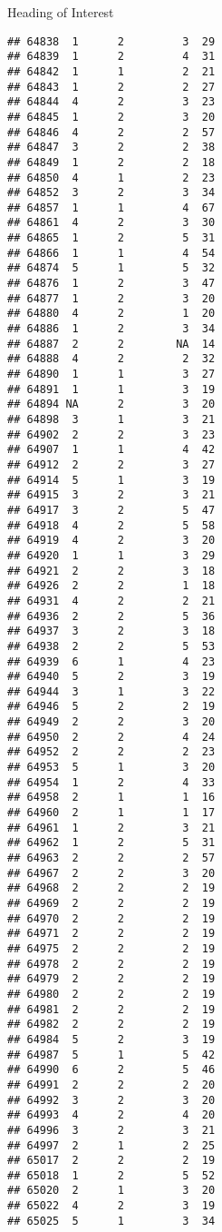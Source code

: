 \documentclass[
  ignorenonframetext,
]{beamer}
\begin{document}
\begin{frame}[fragile]{Heading of Interest}
\begin{verbatim}
## 64838  1      2         3  29
## 64839  1      2         4  31
## 64842  1      1         2  21
## 64843  1      2         2  27
## 64844  4      2         3  23
## 64845  1      2         3  20
## 64846  4      2         2  57
## 64847  3      2         2  38
## 64849  1      2         2  18
## 64850  4      1         2  23
## 64852  3      2         3  34
## 64857  1      1         4  67
## 64861  4      2         3  30
## 64865  1      2         5  31
## 64866  1      1         4  54
## 64874  5      1         5  32
## 64876  1      2         3  47
## 64877  1      2         3  20
## 64880  4      2         1  20
## 64886  1      2         3  34
## 64887  2      2        NA  14
## 64888  4      2         2  32
## 64890  1      1         3  27
## 64891  1      1         3  19
## 64894 NA      2         3  20
## 64898  3      1         3  21
## 64902  2      2         3  23
## 64907  1      1         4  42
## 64912  2      2         3  27
## 64914  5      1         3  19
## 64915  3      2         3  21
## 64917  3      2         5  47
## 64918  4      2         5  58
## 64919  4      2         3  20
## 64920  1      1         3  29
## 64921  2      2         3  18
## 64926  2      2         1  18
## 64931  4      2         2  21
## 64936  2      2         5  36
## 64937  3      2         3  18
## 64938  2      2         5  53
## 64939  6      1         4  23
## 64940  5      2         3  19
## 64944  3      1         3  22
## 64946  5      2         2  19
## 64949  2      2         3  20
## 64950  2      2         4  24
## 64952  2      2         2  23
## 64953  5      1         3  20
## 64954  1      2         4  33
## 64958  2      1         1  16
## 64960  2      1         1  17
## 64961  1      2         3  21
## 64962  1      2         5  31
## 64963  2      2         2  57
## 64967  2      2         3  20
## 64968  2      2         2  19
## 64969  2      2         2  19
## 64970  2      2         2  19
## 64971  2      2         2  19
## 64975  2      2         2  19
## 64978  2      2         2  19
## 64979  2      2         2  19
## 64980  2      2         2  19
## 64981  2      2         2  19
## 64982  2      2         2  19
## 64984  5      2         3  19
## 64987  5      1         5  42
## 64990  6      2         5  46
## 64991  2      2         2  20
## 64992  3      2         3  20
## 64993  4      2         4  20
## 64996  3      2         3  21
## 64997  2      1         2  25
## 65017  2      2         2  19
## 65018  1      2         5  52
## 65020  2      1         3  20
## 65022  4      2         3  19
## 65025  5      1         3  34

\end{verbatim}
\end{frame}
\end{document}
